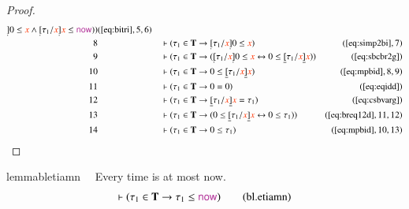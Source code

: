 \begin{proof}
\begin{align}
      \underaccent{\dot}{]} 0 \le \msc{x} \wedge
      \underaccent{\dot}{[} \tau_1 / \msc{x}
      \underaccent{\dot}{]} \msc{x} \le \mathsf{\mc{now}} )
      )&(\mbox{\ref{eq:bitri}},5,6)\notag
  \\ 8 &&  & \vdash ( \tau_1 \in \mathbf{T} \rightarrow \underaccent{\dot}{[}
      \tau_1 / \msc{x} \underaccent{\dot}{]} 0 \le \msc{x}
      )&(\mbox{\ref{eq:simp2bi}},7)\notag
  \\ 9 &&  & \vdash ( \tau_1 \in \mathbf{T} \rightarrow ( \underaccent{\dot}{[}
      \tau_1 / \msc{x} \underaccent{\dot}{]} 0 \le \msc{x}
      \leftrightarrow 0 \le \underline{[} \tau_1 / \msc{x}
      \underline{]} \msc{x} )
      )&(\mbox{\ref{eq:sbcbr2g}})\notag
  \\ 10 &&  & \vdash ( \tau_1 \in \mathbf{T} \rightarrow 0 \le \underline{[}
      \tau_1 / \msc{x} \underline{]} \msc{x}
      )&(\mbox{\ref{eq:mpbid}},8,9)\notag
  \\ 11 &&  & \vdash ( \tau_1 \in \mathbf{T} \rightarrow 0 = 0
      )&(\mbox{\ref{eq:eqidd}})\notag
  \\ 12 &&  & \vdash ( \tau_1 \in \mathbf{T} \rightarrow \underline{[} \tau_1 /
      \msc{x} \underline{]} \msc{x} = \tau_1
      )&(\mbox{\ref{eq:csbvarg}})\notag
  \\ 13 &&  & \vdash ( \tau_1 \in \mathbf{T} \rightarrow ( 0 \le \underline{[}
      \tau_1 / \msc{x} \underline{]} \msc{x}
      \leftrightarrow 0 \le \tau_1 )
      )&(\mbox{\ref{eq:breq12d}},11,12)\notag
  \\ 14 &&  & \vdash ( \tau_1 \in \mathbf{T} \rightarrow 0 \le \tau_1
      )&(\mbox{\ref{eq:mpbid}},10,13)\notag
\end{align}
\end{proof}

\begin{restatable}{lemma}{bletiamn}~~ Every time is at most now.
\begin{align}
\vdash ( \tau_1 \in \mathbf{T} \rightarrow \tau_1 \le \mathsf{\mc{now}}
    )\label{eq:bl.etiamn}\tag{bl.etiamn}
\end{align}
\end{restatable}

